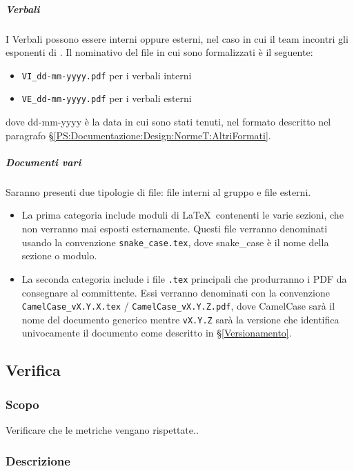 			\subparagraph{Verbali}	\label{NomenclaturaVerbali}
			I Verbali  possono essere interni oppure esterni, nel caso in cui il team incontri gli esponenti di \II.
			Il nominativo del file in cui sono formalizzati è il seguente:
			\begin{itemize}
				\item \texttt{VI\_dd-mm-yyyy.pdf} per i verbali interni
				\item \texttt{VE\_dd-mm-yyyy.pdf} per i verbali esterni
			\end{itemize}
			dove dd-mm-yyyy è la data in cui sono stati tenuti, nel formato descritto nel paragrafo \S\ref{PS:Documentazione:Design:NormeT:AltriFormati}.

			\subparagraph{Documenti vari}
			Saranno presenti due tipologie di file: file interni al gruppo e file esterni.
			\begin{itemize}
				\item La prima categoria include moduli di \LaTeX\ contenenti le varie sezioni, che non verranno mai esposti esternamente. Questi file verranno
					denominati usando la convenzione \texttt{snake\_case.tex}, dove snake\_case è il nome della sezione o modulo.
				\item La seconda categoria include i file \texttt{.tex} principali che produrranno i PDF da consegnare al committente. Essi verranno denominati
					con la convenzione \texttt{CamelCase\_vX.Y.X.tex} / \texttt{CamelCase\_vX.Y.Z.pdf}, dove CamelCase sarà il nome del documento generico mentre
					\texttt{vX.Y.Z} sarà la versione che identifica univocamente il documento come descritto in \S\ref{Versionamento}.
			\end{itemize}

	\subsection{Verifica}

		\subsubsection{Scopo}
		Verificare che le metriche vengano rispettate..


		\subsubsection{Descrizione}

